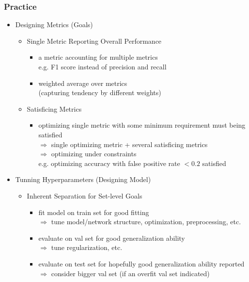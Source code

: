 \subsubsection{Practice}
\begin{itemize}
\item Designing Metrics (Goals)
	\begin{itemize}
	\item Single Metric Reporting Overall Performance
		\begin{itemize}
		\item a metric accounting for multiple metrics \\
		e.g. F1 score instead of precision and recall
		\item weighted average over metrics \\
		(capturing tendency by different weights)
		\end{itemize}
	\item Satisficing Metrics
		\begin{itemize}
		\item optimizing single metric with some minimum requirement must being satisfied \\ 
		$\Rightarrow$ single optimizing metric + several satisficing metrics \\ 
		$\Rightarrow$ optimizing under constraints \\
		e.g. optimizing accuracy with false positive rate $< 0.2$ satisfied
		\end{itemize}
	\end{itemize}
	
\item Tunning Hyperparameters (Designing Model)
	\begin{itemize}
	\item Inherent Separation for Set-level Goals
		\begin{itemize}
		\item fit model on train set for good fitting \\
		$\Rightarrow$ tune model/network structure, optimization, preprocessing, etc.

		\item evaluate on val set for good generalization ability \\
		$\Rightarrow$ tune regularization, etc.

		\item evaluate on test set for hopefully good generalization ability reported \\
		$\Rightarrow$ consider bigger val set (if an overfit val set indicated)


\end{itemize}
\end{itemize}
\end{itemize}
